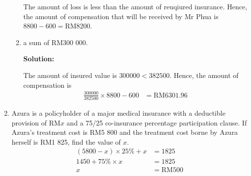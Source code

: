 \documentclass{report}
\newcommand{\sol}{

    \vspace{0.5em}\textbf{Solution:}\vspace{0.5em}}
\begin{document}
\begin{enumerate}
\begin{enumerate}
                    The amount of loss is less than the amount of reuqiured insurance. Hence, the
                    amount of compensation that will be received by Mr Phua is $8 800 - 600 =
                        \text{RM} 8 200$.

              \item a sum of RM300 000. \sol{}

                    The amount of insured value is $300 000 < 382 500$. Hence, the amount of
                    compensation is
                    \begin{align*}
                        \frac{300 000}{382 500} \times 8 800 - 600 & = \text{RM} 6 301.96
                    \end{align*}
          \end{enumerate}
    \item Azura is a policyholder of a major medical insurance with a deductible
          provision of $\mathrm{RM}x$ and a 75/25 co-insurance percentage participation
          clause. If Azura's treatment cost is RM5 800 and the treatment cost borne by
          Azura herself is RM1 825, find the value of $x$.
          \begin{align*}
              (5800 - x) \times 25\% + x & = 1825          \\
              1450 + 75\% \times x       & = 1825          \\
              x                          & = \text{RM} 500
          \end{align*}

\end{enumerate}
\end{document}
